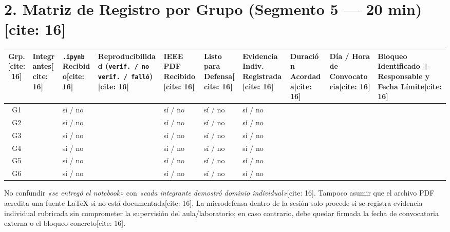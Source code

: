 \documentclass[10pt, a4paper, landscape]{article}
\begin{document}
\section*{2. Matriz de Registro por Grupo (Segmento 5 — 20 min)[cite: 16]}
\begin{center}
\scriptsize
\setlength{\tabcolsep}{3pt}
\renewcommand{\arraystretch}{1.55}
\begin{tabularx}{\textwidth}{|c|>{\hsize=1.15\hsize\raggedright\arraybackslash}X|>{\hsize=0.75\hsize\centering\arraybackslash}X|>{\hsize=0.95\hsize\centering\arraybackslash}X|>{\hsize=0.75\hsize\centering\arraybackslash}X|>{\hsize=0.75\hsize\centering\arraybackslash}X|>{\hsize=1.00\hsize\centering\arraybackslash}X|>{\hsize=0.70\hsize\centering\arraybackslash}X|>{\hsize=1.20\hsize\raggedright\arraybackslash}X|>{\hsize=1.75\hsize\raggedright\arraybackslash}X|}
\hline
\rowcolor{ucbblue!15}
\textbf{Grp.}[cite: 16] & \textbf{Integrantes}[cite: 16] & \textbf{\texttt{.ipynb} Recibido}[cite: 16] & \textbf{Reproducibilidad} (\texttt{verif. / no verif. / falló})[cite: 16] & \textbf{IEEE PDF Recibido}[cite: 16] & \textbf{Listo para Defensa}[cite: 16] & \textbf{Evidencia Indiv. Registrada}[cite: 16] & \textbf{Duración Acordada}[cite: 16] & \textbf{Día / Hora de Convocatoria}[cite: 16] & \textbf{Bloqueo Identificado + Responsable y Fecha Límite}[cite: 16] \\ \hline
G1 & & sí / no & & sí / no & sí / no & sí / no & & & \\ \hline
G2 & & sí / no & & sí / no & sí / no & sí / no & & & \\ \hline
G3 & & sí / no & & sí / no & sí / no & sí / no & & & \\ \hline
G4 & & sí / no & & sí / no & sí / no & sí / no & & & \\ \hline
G5 & & sí / no & & sí / no & sí / no & sí / no & & & \\ \hline
G6 & & sí / no & & sí / no & sí / no & sí / no & & & \\ \hline
\end{tabularx}
\end{center}

\vspace{0.2cm}
\begin{tcolorbox}[colback=red!5, colframe=red!70!black, title=\textbf{Regla de Integridad Evaluativa para Hito 2} {[cite: 16]}, left=2mm, right=2mm, top=1mm, bottom=1mm]
    \scriptsize\raggedright
    No confundir \textit{«se entregó el notebook»} con \textit{«cada integrante demostró dominio individual»}[cite: 16]. Tampoco asumir que el archivo PDF acredita una fuente LaTeX si no está documentada[cite: 16]. La microdefensa dentro de la sesión solo procede si se registra evidencia individual rubricada sin comprometer la supervisión del aula/laboratorio; en caso contrario, debe quedar firmada la fecha de convocatoria externa o el bloqueo concreto[cite: 16].
\end{tcolorbox}
\end{document}
